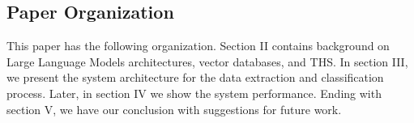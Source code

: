 \subsection{Paper Organization}
This paper has the following organization. Section II contains background on Large Language Models architectures, vector databases, and THS. In section III, we present the system architecture for the data extraction and classification process. Later, in section IV we show the system performance. Ending with section V, we have our conclusion with suggestions for future work.
